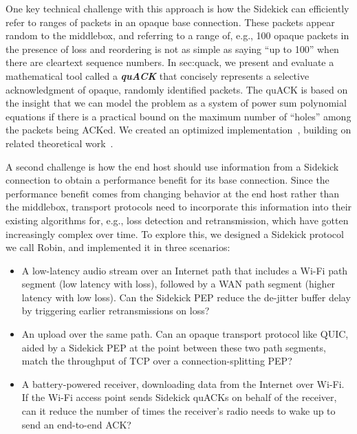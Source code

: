 One key technical challenge with this approach is how the Sidekick can
efficiently refer to ranges of packets in an opaque base connection. These
packets appear random to the middlebox, and referring to a range of, e.g., 100
opaque packets in the presence of loss and reordering is not as simple as
saying ``up to 100'' when there are cleartext sequence numbers. In \Cref
{sec:quack}, we present and evaluate a mathematical tool called a \emph
{\bf quACK} that concisely represents a selective acknowledgment of opaque,
randomly identified packets. The quACK is based on the insight that we can
model the problem as a system of power sum polynomial equations if there is a
practical bound on the maximum number of ``holes'' among the packets being
ACKed. We created an optimized implementation~\cite{quack-github}, building on
related theoretical work~\cite
{eppstein2011straggler,minsky2003set,karpovsky2003data}.

A second challenge is how the end host should use information from a Sidekick
connection to obtain a performance benefit for its base connection. Since the
performance benefit comes from changing behavior at the end host rather than
the middlebox, transport protocols need to incorporate this information into
their existing algorithms for, e.g., loss detection and retransmission, which
have gotten increasingly complex over time. To explore this, we designed a
Sidekick protocol we call Robin, and implemented it in three scenarios:
\begin{itemize}[noitemsep,topsep=2pt]
\item A low-latency audio stream over an Internet path that includes a Wi-Fi path segment
  (low latency with loss), followed by a WAN path segment (higher latency
  with low loss). Can the Sidekick PEP reduce the de-jitter buffer delay
  by triggering earlier retransmissions on loss?

\item An upload over the same path. Can an opaque transport protocol like QUIC,
  aided by a Sidekick PEP at the point between these two path segments, match
  the throughput of TCP over a connection-splitting PEP?

\item A battery-powered receiver, downloading data from the Internet over Wi-Fi.
  If the Wi-Fi access point sends Sidekick quACKs on behalf of the receiver,
  can it reduce the number of times the receiver's radio needs to wake up
  to send an end-to-end ACK?
\end{itemize}


